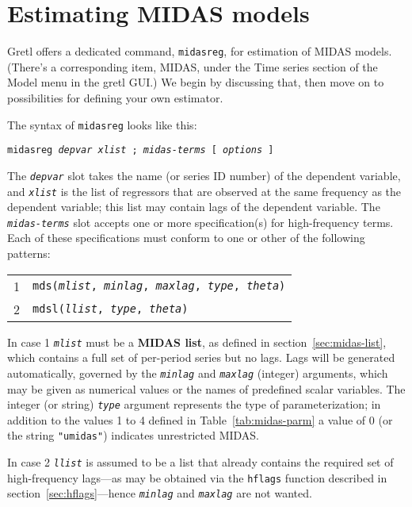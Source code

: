 \section{Estimating MIDAS models}
\label{sec:estimation}

Gretl offers a dedicated command, \texttt{midasreg}, for estimation of
MIDAS models. (There's a corresponding item, \textsf{MIDAS}, under the
\textsf{Time series} section of the \textsf{Model} menu in the gretl
GUI.) We begin by discussing that, then move on to possibilities for
defining your own estimator.

The syntax of \texttt{midasreg} looks like this:

\texttt{midasreg \textsl{depvar} \textsl{xlist} ;
\textsl{midas-terms} [ \textsl{options} ]}

The \texttt{\textsl{depvar}} slot takes the name (or series ID number)
of the dependent variable, and \texttt{\textsl{xlist}} is the list of
regressors that are observed at the same frequency as the dependent
variable; this list may contain lags of the dependent variable. The
\texttt{\textsl{midas-terms}} slot accepts one or more specification(s)
for high-frequency terms. Each of these specifications must conform to
one or other of the following patterns:

\begin{tabular}{ll}
1 & \texttt{mds(\textsl{mlist}, \textsl{minlag}, 
   \textsl{maxlag}, \textsl{type}, \textsl{theta})} \\
2 & \texttt{mdsl(\textsl{llist}, \textsl{type}, \textsl{theta})}
\end{tabular}

In case 1 \texttt{\textsl{mlist}} must be a \textbf{MIDAS list}, as
defined in section~\ref{sec:midas-list}, which contains a full set of
per-period series but no lags. Lags will be generated automatically,
governed by the \texttt{\textsl{minlag}} and \texttt{\textsl{maxlag}}
(integer) arguments, which may be given as numerical values or the
names of predefined scalar variables. The integer (or string)
\texttt{\textsl{type}} argument represents the type of
parameterization; in addition to the values 1 to 4 defined in
Table~\ref{tab:midas-parm} a value of 0 (or the string
\verb|"umidas"|) indicates unrestricted MIDAS.

In case 2 \texttt{\textsl{llist}} is assumed to be a list that
already contains the required set of high-frequency lags---as may be
obtained via the \texttt{hflags} function described in
section~\ref{sec:hflags}---hence \texttt{\textsl{minlag}} and
\texttt{\textsl{maxlag}} are not wanted.

